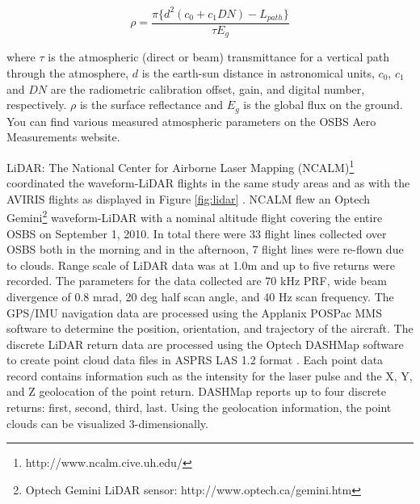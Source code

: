 \documentclass[remotesensing,article,accept,moreauthors,pdftex,12pt,a4paper]{mdpi}
\begin{document}
\begin{equation}
\rho =\frac{\pi \{ d^2 (c_0 + c_1 D N) - L_{path}\}}{\tau E_g}
\end{equation}

where $\tau$ is the atmospheric (direct or beam) transmittance for a vertical path through the atmosphere, $d$ is the earth-sun distance in astronomical units, $c_0$, $c_1$ and $ D N$ are the radiometric calibration offset, gain, and digital number, respectively. $\rho$ is the surface reflectance and $E_g$ is the global flux on the ground. You can find various measured atmospheric parameters on the OSBS Aero Measurements website.

LiDAR: The National Center for Airborne Laser Mapping (NCALM)\footnote{http://www.ncalm.cive.uh.edu/} coordinated the waveform-LiDAR flights in the same study areas and as  with the AVIRIS flights as displayed in Figure \ref{fig:lidar} \cite{neon2010aopdatarelease}. NCALM flew an Optech Gemini\footnote{Optech Gemini LiDAR sensor: http://www.optech.ca/gemini.htm} waveform-LiDAR with a nominal altitude flight covering the entire OSBS on September 1, 2010. In total there were 33 flight lines collected over OSBS both in the morning and in the afternoon, 7 flight lines were re-flown due to clouds. Range scale of LiDAR data was at 1.0m and up to five returns were recorded. The parameters for the data collected are 70 kHz PRF, wide beam divergence of 0.8 mrad, 20 deg half scan angle, and 40 Hz scan frequency. The GPS/IMU navigation data are processed using the Applanix POSPac MMS software to determine the position, orientation, and trajectory of the aircraft. The discrete LiDAR return data are processed using the Optech DASHMap software to create point cloud data files in ASPRS LAS 1.2 format \cite{las12format}. Each point data record contains information such as the intensity for the laser pulse and the X, Y, and Z geolocation of the point return. DASHMap reports up to four discrete returns: first, second, third, last. Using the geolocation information, the point clouds can be visualized 3-dimensionally.
\end{document}
